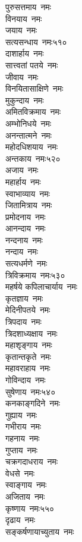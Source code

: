 \begin{multicols}{2}
\begin{flushleft}
पुरुसत्तमाय~नमः\\
विनयाय~नमः\\
जयाय~नमः\\
सत्यसन्धाय~नमः\hfill ५१०\\
दाशार्हाय~नमः\\
सात्त्वतां पतये~नमः\\
जीवाय~नमः\\
विनयितासाक्षिणे~नमः\\
मुकुन्दाय~नमः\\
अमितविक्रमाय~नमः\\
अम्भोनिधये~नमः\\
अनन्तात्मने~नमः\\
महोदधिशयाय~नमः\\
अन्तकाय~नमः\hfill ५२०\\
अजाय~नमः\\
महार्हाय~नमः\\
स्वाभाव्याय~नमः\\
जितामित्राय~नमः\\
प्रमोदनाय~नमः\\
आनन्दाय~नमः\\
नन्दनाय~नमः\\
नन्दाय~नमः\\
सत्यधर्मणे~नमः\\
त्रिविक्रमाय~नमः\hfill ५३०\\
महर्षये कपिलाचार्याय~नमः\\
कृतज्ञाय~नमः\\
मेदिनीपतये~नमः\\
त्रिपदाय~नमः\\
त्रिदशाध्यक्षाय~नमः\\
महाशृङ्गाय~नमः\\
कृतान्तकृते~नमः\\
महावराहाय~नमः\\
गोविन्दाय~नमः\\
सुषेणाय~नमः\hfill ५४०\\
कनकाङ्गदिने~नमः\\
गुह्याय~नमः\\
गभीराय~नमः\\
गहनाय~नमः\\
गुप्ताय~नमः\\
चक्रगदाधराय~नमः\\
वेधसे~नमः\\
स्वाङ्गाय~नमः\\
अजिताय~नमः\\
कृष्णाय~नमः\hfill ५५०\\
दृढाय~नमः\\
सङ्कर्षणायाच्युताय~नमः\\

\end{flushleft}
\end{multicols}
